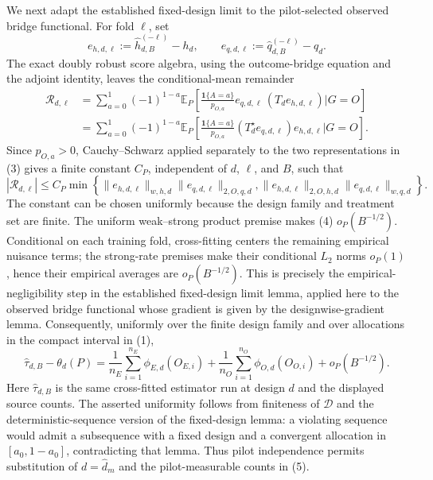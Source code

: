We next adapt the established fixed-design limit to the pilot-selected observed bridge functional.  For fold \(\ell\), set
\[
 e_{h,d,\ell}:=\widehat h_{d,B}^{(-\ell)}-h_d,
 \qquad
 e_{q,d,\ell}:=\widehat q_{d,B}^{(-\ell)}-q_d.
\]
The exact doubly robust score algebra, using the outcome-bridge equation and the adjoint identity, leaves the conditional-mean remainder
\[
\begin{aligned}
 \mathcal R_{d,\ell}
 &=\sum_{a=0}^1(-1)^{1-a}
 \mathbb E_P\!\left[
 \frac{\mathbf 1\{A=a\}}{p_{O,a}}
 e_{q,d,\ell}\,(T_de_{h,d,\ell})\mathrel{\Big|}G=O\right]\\
 &=\sum_{a=0}^1(-1)^{1-a}
 \mathbb E_P\!\left[
 \frac{\mathbf 1\{A=a\}}{p_{O,a}}
 (T_d^\star e_{q,d,\ell})e_{h,d,\ell}\mathrel{\Big|}G=O\right].
\end{aligned}                                                              \tag{3}
\]
Since \(p_{O,a}>0\), Cauchy--Schwarz applied separately to the two representations in (3) gives a finite constant \(C_P\), independent of \(d\), \(\ell\), and \(B\), such that
\[
 |\mathcal R_{d,\ell}|
 \le C_P\min\left\{
 \|e_{h,d,\ell}\|_{w,h,d}\|e_{q,d,\ell}\|_{2,O,q,d},
 \|e_{h,d,\ell}\|_{2,O,h,d}\|e_{q,d,\ell}\|_{w,q,d}
 \right\}.                                                               \tag{4}
\]
The constant can be chosen uniformly because the design family and treatment set are finite.  The uniform weak--strong product premise makes (4) \(o_P(B^{-1/2})\).  Conditional on each training fold, cross-fitting centers the remaining empirical nuisance terms; the strong-rate premises make their conditional \(L_2\) norms \(o_P(1)\), hence their empirical averages are \(o_P(B^{-1/2})\).  This is precisely the empirical-negligibility step in the established fixed-design limit lemma, applied here to the observed bridge functional whose gradient is given by the designwise-gradient lemma.  Consequently, uniformly over the finite design family and over allocations in the compact interval in (1),
\[
 \widehat\tau_{d,B}-\theta_d(P)
 =\frac1{n_E}\sum_{i=1}^{n_E}\phi_{E,d}(O_{E,i})
  +\frac1{n_O}\sum_{i=1}^{n_O}\phi_{O,d}(O_{O,i})
  +o_P(B^{-1/2}).                                                          \tag{5}
\]
Here \(\widehat\tau_{d,B}\) is the same cross-fitted estimator run at design \(d\) and the displayed source counts.  The asserted uniformity follows from finiteness of \(\mathcal D\) and the deterministic-sequence version of the fixed-design lemma: a violating sequence would admit a subsequence with a fixed design and a convergent allocation in \([a_0,1-a_0]\), contradicting that lemma.  Thus pilot independence permits substitution of \(d=\widehat d_m\) and the pilot-measurable counts in (5).

